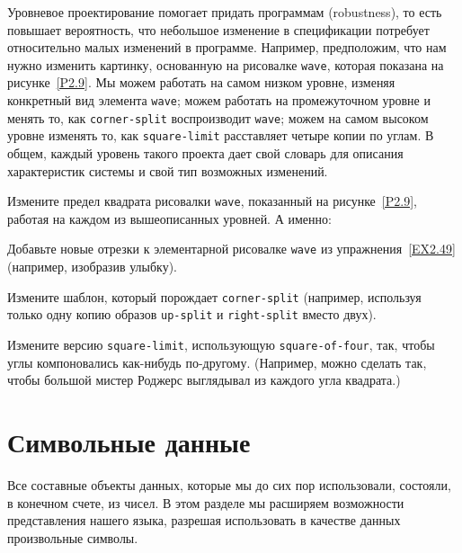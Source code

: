 Уровневое проектирование помогает придать программам
 (robus\-t\-ness), то есть повышает
вероятность, что небольшое изменение в спецификации потребует
относительно малых изменений в программе.  Например, предположим, что
нам нужно изменить картинку, основанную на рисовалке
{\tt wave}, которая показана на рисунке~\ref{P2.9}.  Мы
можем работать на самом низком уровне, изменяя конкретный вид элемента 
{\tt wave}; можем работать на промежуточном уровне и менять то, 
как {\tt corner-split} воспроизводит {\tt wave}; можем
на самом высоком уровне изменять то, как {\tt square-limit}
расставляет четыре копии по углам.  В общем, каждый уровень такого
проекта дает свой словарь для описания характеристик системы и свой
тип возможных изменений.
{\sloppy

}
\begin{exercise}{2.52}\label{EX2.52}%
Измените предел квадрата рисовалки {\tt wave}, 
показанный на рисунке~\ref{P2.9}, работая на каждом из
вышеописанных уровней. А именно:

\begin{plainenum}
\item
Добавьте новые отрезки к элементарной рисовалке
{\tt wave} из упражнения~\ref{EX2.49} (например,
изобразив улыбку).

\item
Измените шаблон, который порождает
{\tt corner-split} (например, используя то\-лько одну копию
образов {\tt up-split} и {\tt right-split} вместо двух).

\item
Измените версию {\tt square-limit},
использующую {\tt square-of-four}, так, чтобы углы
компоновались как-нибудь по-другому. (Например, можно сделать так, чтобы
большой мистер Роджерс выглядывал из каждого угла квадрата.)
\end{plainenum}
\end{exercise}

\section{Символьные данные}
\label{SYMBOLIC-DATA}


Все составные объекты данных, которые мы до сих пор
использовали, состояли, в конечном счете, из чисел.  В этом 
разделе мы
расширяем возможности представления нашего языка, разрешая использовать
в качестве данных произвольные символы.

